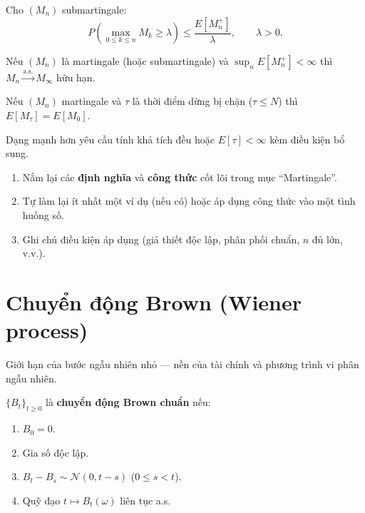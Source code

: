 \documentclass[12pt,a4paper]{article}
\begin{document}
\begin{dinhly}[title={Bất đẳng thức Doob}]
  Cho $(M_n)$ submartingale:
  \[
    P\!\left(\max_{0 \le k \le n} M_k \ge \lambda\right) \le \frac{E[M_n^+]}{\lambda}, \qquad \lambda > 0.
  \]
\end{dinhly}

\begin{dinhly}[title={Định lý hội tụ martingale (Doob)}]
  Nếu $(M_n)$ là martingale (hoặc submartingale) và $\sup_n E[M_n^+] < \infty$ thì $M_n \xrightarrow{\text{a.s.}} M_\infty$ hữu hạn.
\end{dinhly}

\begin{dinhly}[title={Optional Stopping Theorem}]
  Nếu $(M_n)$ martingale và $\tau$ là thời điểm dừng bị chặn ($\tau \le N$) thì $E[M_\tau] = E[M_0]$.

  Dạng mạnh hơn yêu cầu tính khả tích đều hoặc $E[\tau] < \infty$ kèm điều kiện bổ sung.
\end{dinhly}


\begin{tongket}[title={Tổng kết: Martingale}]
\begin{enumerate}
  \item Nắm lại các \textbf{định nghĩa} và \textbf{công thức} cốt lõi trong mục ``Martingale''.
  \item Tự làm lại ít nhất một ví dụ (nếu có) hoặc áp dụng công thức vào một tình huống số.
  \item Ghi chú điều kiện áp dụng (giả thiết độc lập, phân phối chuẩn, $n$ đủ lớn, v.v.).
\end{enumerate}
\end{tongket}

\section{Chuyển động Brown (Wiener process)}

\begin{dongco}[title={Động cơ --- Chuyển động Brown (Wiener process)}]
Giới hạn của bước ngẫu nhiên nhỏ --- nền của tài chính và phương trình vi phân ngẫu nhiên.
\end{dongco}

\begin{dinhnghia}
  $\{B_t\}_{t \ge 0}$ là \textbf{chuyển động Brown chuẩn} nếu:
  \begin{enumerate}
    \item $B_0 = 0$.
    \item Gia số độc lập.
    \item $B_t - B_s \sim \mathcal{N}(0, t - s)$ ($0 \le s < t$).
    \item Quỹ đạo $t \mapsto B_t(\omega)$ liên tục a.s.
  \end{enumerate}
\end{dinhnghia}
\end{document}
